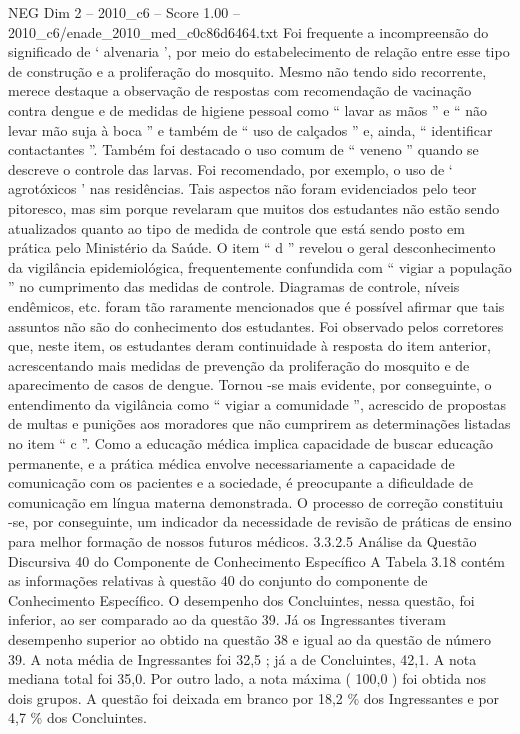 \begin{textsample}{NEG Dim 2 – 2010\_c6 – Score 1.00 – 2010\_c6/enade\_2010\_med\_c0c86d6464.txt}
Foi frequente a incompreensão do significado de ‘ alvenaria ’, por meio do estabelecimento de relação entre esse tipo de construção e a proliferação do mosquito.
Mesmo não tendo sido recorrente, merece destaque a observação de respostas com recomendação de vacinação contra dengue e de medidas de higiene pessoal como “ lavar as mãos ” e “ não levar mão suja à boca ” e também de “ uso de calçados ” e, ainda, “ identificar contactantes ”.
Também foi destacado o uso comum de “ veneno ” quando se descreve o controle das larvas.
Foi recomendado, por exemplo, o uso de ‘ agrotóxicos ’ nas residências.
Tais aspectos não foram evidenciados pelo teor pitoresco, mas sim porque revelaram que muitos dos estudantes não estão sendo atualizados quanto ao tipo de medida de controle que está sendo posto em prática pelo Ministério da Saúde.
O item “ d ” revelou o geral desconhecimento da vigilância epidemiológica, frequentemente confundida com “ vigiar a população ” no cumprimento das medidas de controle.
Diagramas de controle, níveis endêmicos, etc. foram tão raramente mencionados que é possível afirmar que tais assuntos não são do conhecimento dos estudantes.
Foi observado pelos corretores que, neste item, os estudantes deram continuidade à resposta do item anterior, acrescentando mais medidas de prevenção da proliferação do mosquito e de aparecimento de casos de dengue.
Tornou -se mais evidente, por conseguinte, o entendimento da vigilância como “ vigiar a comunidade ”, acrescido de propostas de multas e punições aos moradores que não cumprirem as determinações listadas no item “ c ”.
Como a educação médica implica capacidade de buscar educação permanente, e a prática médica envolve necessariamente a capacidade de comunicação com os pacientes e a sociedade, é preocupante a dificuldade de comunicação em língua materna demonstrada.
O processo de correção constituiu -se, por conseguinte, um indicador da necessidade de revisão de práticas de ensino para melhor formação de nossos futuros médicos. 3.3.2.5 Análise da Questão Discursiva 40 do Componente de Conhecimento Específico A Tabela 3.18 contém as informações relativas à questão 40 do conjunto do componente de Conhecimento Específico.
O desempenho dos Concluintes, nessa questão, foi inferior, ao ser comparado ao da questão 39.
Já os Ingressantes tiveram desempenho superior ao obtido na questão 38 e igual ao da questão de número 39.
A nota média de Ingressantes foi 32,5 ; já a de Concluintes, 42,1.
A nota mediana total foi 35,0.
Por outro lado, a nota máxima ( 100,0 ) foi obtida nos dois grupos.
A questão foi deixada em branco por 18,2 \% dos Ingressantes e por 4,7 \% dos Concluintes.

\end{textsample}
